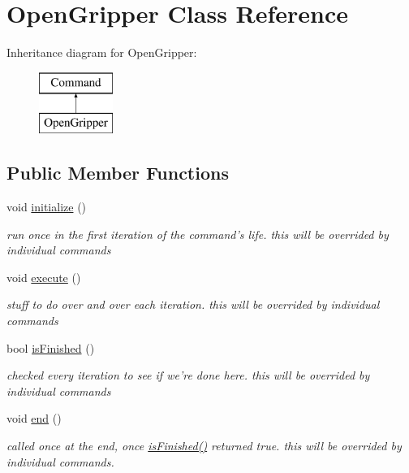 \hypertarget{classOpenGripper}{\section{Open\-Gripper Class Reference}
\label{classOpenGripper}
}
Inheritance diagram for Open\-Gripper\-:\begin{figure}[H]
\begin{center}
\leavevmode
\includegraphics[height=2.000000cm]{classOpenGripper}
\end{center}
\end{figure}
\subsection*{Public Member Functions}
\begin{DoxyCompactItemize}
\item 
\hypertarget{classOpenGripper_a13dc36eb38dc51e85fefbccbef87a981}{void \hyperlink{classOpenGripper_a13dc36eb38dc51e85fefbccbef87a981}{initialize} ()}\label{classOpenGripper_a13dc36eb38dc51e85fefbccbef87a981}

\begin{DoxyCompactList}\small\item\em run once in the first iteration of the command's life. this will be overrided by individual commands \end{DoxyCompactList}\item 
\hypertarget{classOpenGripper_a358b40de6a9c051a2c7f322747c37dad}{void \hyperlink{classOpenGripper_a358b40de6a9c051a2c7f322747c37dad}{execute} ()}\label{classOpenGripper_a358b40de6a9c051a2c7f322747c37dad}

\begin{DoxyCompactList}\small\item\em stuff to do over and over each iteration. this will be overrided by individual commands \end{DoxyCompactList}\item 
bool \hyperlink{classOpenGripper_a334eebec59e348ec33a78d238de85baa}{is\-Finished} ()
\begin{DoxyCompactList}\small\item\em checked every iteration to see if we're done here. this will be overrided by individual commands \end{DoxyCompactList}\item 
\hypertarget{classOpenGripper_ad807b567e6ca9c8ef0a4f7a143506546}{void \hyperlink{classOpenGripper_ad807b567e6ca9c8ef0a4f7a143506546}{end} ()}\label{classOpenGripper_ad807b567e6ca9c8ef0a4f7a143506546}

\begin{DoxyCompactList}\small\item\em called once at the end, once \hyperlink{classOpenGripper_a334eebec59e348ec33a78d238de85baa}{is\-Finished()} returned true. this will be overrided by individual commands. \end{DoxyCompactList}\end{DoxyCompactItemize}
